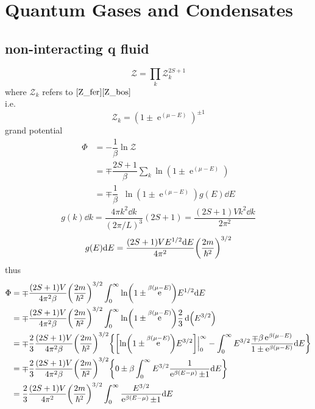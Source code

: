 \documentclass[UTF8]{ctexart} %
\DeclareMathOperator{\intinf}{\int_0^\infty}
\DeclareMathOperator{\e}{\mathrm{e}}
\numberwithin{equation}{subsection}
\begin{document}
\section{Quantum Gases and Condensates}
\subsection{non-interacting q fluid}
\begin{equation}\label{key}
\mathcal{Z} = \prod_k \mathcal{Z}_k^{2S+1}
\end{equation}
where $\mathcal{Z}_k$ refers to $\eqref{Z_fer}\eqref{Z_bos}$\\
i.e.
\begin{equation}\label{key}
\mathcal{Z}_k = (1\pm\e^{(\mu-E)})^{\pm 1}
\end{equation}
grand potential
\begin{equation}\label{key}
\begin{aligned}
\Phi &= -\dfrac{1}{\beta}\ln\mathcal{Z}\\
&= \mp \dfrac{2S + 1}{\beta}\sum_k\ln(1\pm\e^{(\mu-E)})\\
&= \mp \dfrac{1}{\beta} \intinf \ln(1\pm\e^{(\mu-E)})g(E)\dd E
\end{aligned}
\end{equation}
\begin{equation}\label{key}
g(k)\dd k = \dfrac{4\pi k^2\dd k}{(2\pi/L)^3}(2S + 1) = \dfrac{(2S+1)Vk^2\dd k}{2\pi^2}
\end{equation}
\begin{equation}\label{key}
g(E)\dd E = \dfrac{(2S+1)VE^{1/2}\dd E}{4\pi^2}\qty(\dfrac{2m}{\hbar^2})^{3/2}
\end{equation}
thus
\begin{equation}\label{key}
\begin{aligned}
\Phi &= \mp\dfrac{(2S+1)V}{4\pi^2\beta} \qty(\dfrac{2m}{\hbar^2})^{3/2} \intinf \ln(1\pm\e^{\beta(\mu-E)})E^{1/2}\dd E\\
&= \mp\dfrac{(2S+1)V}{4\pi^2\beta} \qty(\dfrac{2m}{\hbar^2})^{3/2} \intinf \ln(1\pm\e^{\beta(\mu-E)})\dfrac{2}{3}\dd(E^{3/2})\\
&= \mp\dfrac{2}{3}\dfrac{(2S+1)V}{4\pi^2\beta} \qty(\dfrac{2m}{\hbar^2})^{3/2} \qty{\qty[\ln(1\pm\e^{\beta(\mu-E)})E^{3/2}]\Big|_0^\infty - \intinf E^{3/2}\dfrac{\mp\beta\e^{\beta(\mu - E)}}{1\pm\e^{\beta(\mu-E)}}\dd E}\\
&= \mp\dfrac{2}{3}\dfrac{(2S+1)V}{4\pi^2\beta} \qty(\dfrac{2m}{\hbar^2})^{3/2} \qty{ 0 \pm \beta\intinf E^{3/2}\dfrac{1}{\e^{\beta(E-\mu)} \pm 1}\dd E }\\
&= \dfrac{2}{3}\dfrac{(2S+1)V}{4\pi^2} \qty(\dfrac{2m}{\hbar^2})^{3/2} \intinf\dfrac{E^{3/2}}{\e^{\beta(E-\mu)} \pm 1}\dd E 
\end{aligned}
\end{equation}
\end{document}
